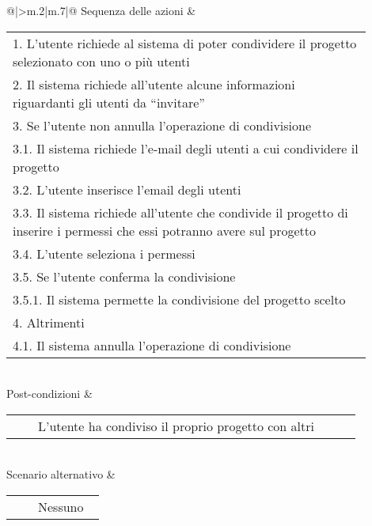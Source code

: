\begin{table}[H]
\begin{longtable}{@{}|>{\centering\arraybackslash}m{.2\textwidth}|m{.7\textwidth}|@{}}
		Sequenza delle azioni & \begin{tabular}{m{0.9\linewidth}}\hspace{0.0cm}1. L'utente richiede al sistema di poter condividere il progetto selezionato con uno o più utenti\\\hspace{0.0cm}2. Il sistema richiede all'utente alcune informazioni riguardanti gli utenti da ``invitare''\\\hspace{0.0cm}3. Se l'utente non annulla l'operazione di condivisione\\\hspace{0.5cm}\hspace{0.0cm}3.1. Il sistema richiede l'e-mail degli utenti a cui condividere il progetto\\\hspace{0.5cm}\hspace{0.0cm}3.2. L'utente inserisce l'email degli utenti\\\hspace{0.5cm}\hspace{0.0cm}3.3. Il sistema richiede all'utente che condivide il progetto di inserire i permessi che essi potranno avere sul progetto\\\hspace{0.5cm}\hspace{0.0cm}3.4. L'utente seleziona i permessi\\\hspace{0.5cm}\hspace{0.0cm}3.5. Se l'utente conferma la condivisione\\\hspace{1.0cm}\hspace{0.5cm}\hspace{0.0cm}3.5.1. Il sistema permette la condivisione del progetto scelto\\\hspace{0.0cm}4. Altrimenti\\\hspace{0.5cm}\hspace{0.0cm}4.1. Il sistema annulla l'operazione di condivisione\\\end{tabular}\\
		Post-condizioni & \begin{tabular}{m{0.9\linewidth}}~~\llap{\textbullet}~~L'utente ha condiviso il proprio progetto con altri\\\end{tabular}\\
		Scenario alternativo & \begin{tabular}{m{0.9\linewidth}}~~\llap{\textbullet}~~Nessuno\\\end{tabular}\\\hline
		
	\end{longtable}
\end{table}

